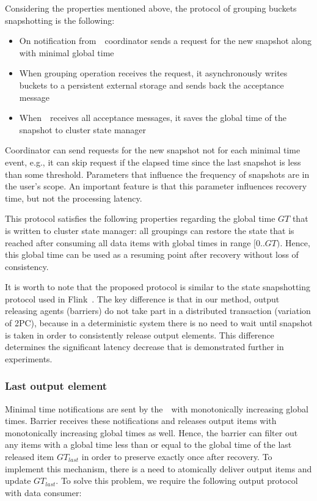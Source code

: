Considering the properties mentioned above, the protocol of grouping buckets snapshotting is the following:

\begin{itemize}
    \item On notification from~\Acker\, coordinator sends a request for the new snapshot along with minimal global time
    \item When grouping operation receives the request, it asynchronously writes buckets to a persistent external storage and sends back the acceptance message
    \item When~\Acker\ receives all acceptance messages, it saves the global time of the snapshot to cluster state manager
\end{itemize}

Coordinator can send requests for the new snapshot not for each minimal time event, e.g., it can skip request if the elapsed time since the last snapshot is less than some threshold. Parameters that influence the frequency of snapshots are in the user's scope. An important feature is that this parameter influences recovery time, but not the processing latency.

This protocol satisfies the following properties regarding the global time $GT$ that is written to cluster state manager: all groupings can restore the state that is reached after consuming all data items with global times in range $[0..GT)$. Hence, this global time can be used as a resuming point after recovery without loss of consistency.

It is worth to note that the proposed protocol is similar to the state snapshotting protocol used in Flink~\cite{Carbone:2017:SMA:3137765.3137777}. The key difference is that in our method, output releasing agents (barriers) do not take part in a distributed transaction (variation of 2PC), because in a deterministic system there is no need to wait until snapshot is taken in order to consistently release output elements. This difference determines the significant latency decrease that is demonstrated further in experiments.

\subsubsection{Last output element}

Minimal time notifications are sent by the~\Acker\ with monotonically increasing global times. Barrier receives these notifications and releases output items with monotonically increasing global times as well. Hence, the barrier can filter out any items with a global time less than or equal to the global time of the last released item $GT_{last}$ in order to preserve exactly once after recovery. To implement this mechanism, there is a need to atomically deliver output items and update $GT_{last}$. To solve this problem, we require the following output protocol with data consumer: 

